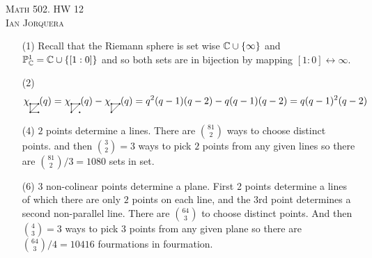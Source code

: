 \documentclass[12pt]{amsart}
\newcommand{\PPt}{\mathbb{P}}
\let\P\PPt
\begin{document}
\begin{center}
    \textsc{Math 502. HW 12\\ Ian Jorquera}
\end{center}
\vspace{1em}

\begin{itemize}
\item[(1)] %
Recall that the Riemann sphere is set wise $\mathbb{C}\cup\{\infty\}$ and $\P_\C^1=\C\cup\{[1:0]\}$ and so both sets are in bijection by mapping $[1:0]\leftrightarrow \infty$.\\

\item[(2)] %
$$\chi\begin{tikzpicture}[scale=0.15, baseline=3mm]
  \draw (0,0) -- (0,2) -- (2,2) -- (0,0) -- (2,0);
  \filldraw (0,0) circle (4pt);
  \filldraw (0,2) circle (4pt);
  \filldraw (2,0) circle (4pt);
  \filldraw (2,2) circle (4pt);
\end{tikzpicture}(q)=\chi\begin{tikzpicture}[scale=0.15, baseline=3mm]
  \draw (0,0) -- (0,2) -- (2,2) -- (0,0);
  \filldraw (0,0) circle (4pt);
  \filldraw (0,2) circle (4pt);
  \filldraw (2,0) circle (4pt);
  \filldraw (2,2) circle (4pt);
\end{tikzpicture}(q)-\chi\begin{tikzpicture}[scale=0.15, baseline=3mm]
  \draw (0,0) -- (0,2) -- (2,2) -- (0,0);
  \filldraw (0,0) circle (4pt);
  \filldraw (0,2) circle (4pt);
  \filldraw (2,2) circle (4pt);
\end{tikzpicture}(q)=q^2(q-1)(q-2)-q(q-1)(q-2)=q(q-1)^2(q-2)$$

\item[(4)] %
$2$ points determine a lines. There are ${81\choose 2}$ ways to choose distinct points. and then ${3\choose 2}=3$ ways to pick $2$ points from any given lines so there are ${81\choose 2}/3=1080$ sets in set.\\

\item[(6)] %
$3$ non-colinear points determine a plane. First 2 points determine a lines of which there are only $2$ points on each line, and the $3$rd point determines a second non-parallel line. There are ${64 \choose 3}$ to choose distinct points. And then ${4\choose 3}=3$ ways to pick $3$ points from any given plane so there are ${64\choose 3}/4=10416$ fourmations in fourmation.\\


\end{itemize}
\end{document}
